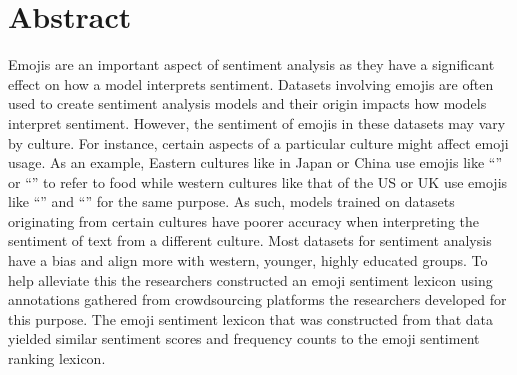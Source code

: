 \chapter*{Abstract}

Emojis are an important aspect of sentiment analysis as they have a significant effect on how a model interprets sentiment. Datasets involving emojis are often used to create sentiment analysis models and their origin impacts how models interpret sentiment. However, the sentiment of emojis in these datasets may vary by culture. For instance, certain aspects of a particular culture might affect emoji usage. As an example, Eastern cultures like in Japan or China use emojis like “” or “” to refer to food while western cultures like that of the US or UK use emojis like “” and “” for the same purpose. As such, models trained on datasets originating from certain cultures have poorer accuracy when interpreting the sentiment of text from a different culture. Most datasets for sentiment analysis have a bias and align more with western, younger, highly educated groups. To help alleviate this the researchers constructed an emoji sentiment lexicon using annotations gathered from crowdsourcing platforms the researchers developed for this purpose. The emoji sentiment lexicon that was constructed from that data yielded similar sentiment scores and frequency counts to the emoji sentiment ranking lexicon.
